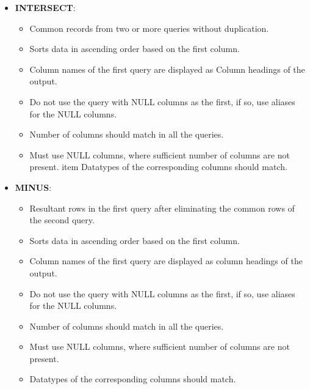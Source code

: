 \begin{flushleft}
\begin{itemize}
\begin{itemize}
		\end{itemize}
		
		\newpage
		\item \textbf{INTERSECT}: 
		\begin{itemize}
			\item Common records from two or more queries without duplication.
			\item Sorts data in ascending order based on the first column.
			\item Column names of the first query are displayed as Column headings of the output.
			\item Do not use the query with NULL columns as the first, if so, use aliases for the NULL columns.
			\item Number of columns should match in all the queries.
			\item Must use NULL columns, where sufficient number of columns are not present.
			item Datatypes of the corresponding columns should match.
			\bigskip
		\end{itemize}
		\newpage
		\item \textbf{MINUS}: 
		\begin{itemize}
			\item Resultant rows in the first query after eliminating the common rows of the second query.
			\item Sorts data in ascending order based on the first column.
			\item Column names of the first query are displayed as column headings of the output.
			\item Do not use the query with NULL columns as the first, if so, use aliases for the NULL columns.
			\item Number of columns should match in all the queries.
			\item Must use NULL columns, where sufficient number of columns are not present.
			\item Datatypes of the corresponding columns should match.
		\end{itemize}


\end{itemize}
\end{flushleft}
